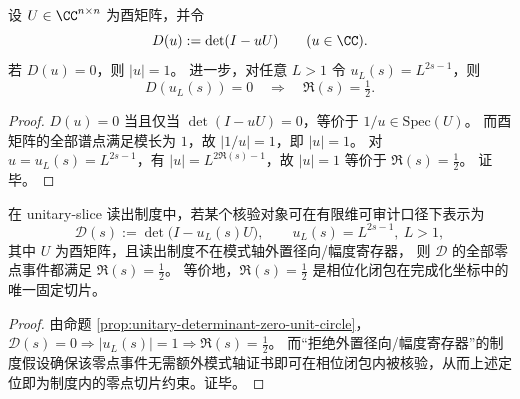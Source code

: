 \begin{proposition}[酉行列式的零点定位：\texorpdfstring{$|u|=1$}{|u|=1}]\label{prop:unitary-determinant-zero-unit-circle}
设 \(U\in\CC^{n\times n}\) 为酉矩阵，并令
\[
D(u):=\det(I-uU)\qquad(u\in\CC).
\]
若 \(D(u)=0\)，则 \(|u|=1\)。
进一步，对任意 \(L>1\) 令 \(u_L(s)=L^{2s-1}\)，则
\[
D(u_L(s))=0\quad\Longrightarrow\quad \Re(s)=\tfrac12.
\]
\end{proposition}
\begin{proof}
\(D(u)=0\) 当且仅当 \(\det(I-uU)=0\)，等价于 \(1/u\in\mathrm{Spec}(U)\)。
而酉矩阵的全部谱点满足模长为 \(1\)，故 \(|1/u|=1\)，即 \(|u|=1\)。
对 \(u=u_L(s)=L^{2s-1}\)，有 \(|u|=L^{2\Re(s)-1}\)，故 \(|u|=1\) 等价于 \(\Re(s)=\tfrac12\)。
证毕。
\end{proof}

\begin{theorem}\label{thm:phase-lift-fixed-slice}
在 unitary-slice 读出制度中，若某个核验对象可在有限维可审计口径下表示为
\[
\mathcal{D}(s):=\det\!\bigl(I-u_L(s)U\bigr),
\qquad
u_L(s)=L^{2s-1},\ L>1,
\]
其中 \(U\) 为酉矩阵，且读出制度不在模式轴外置径向/幅度寄存器，
则 \(\mathcal{D}\) 的全部零点事件都满足 \(\Re(s)=\tfrac12\)。
等价地，\(\Re(s)=\tfrac12\) 是相位化闭包在完成化坐标中的唯一固定切片。
\end{theorem}
\begin{proof}
由命题 \ref{prop:unitary-determinant-zero-unit-circle}，\(\mathcal{D}(s)=0\Rightarrow |u_L(s)|=1\Rightarrow \Re(s)=\tfrac12\)。
而“拒绝外置径向/幅度寄存器”的制度假设确保该零点事件无需额外模式轴证书即可在相位闭包内被核验，从而上述定位即为制度内的零点切片约束。证毕。
\end{proof}

